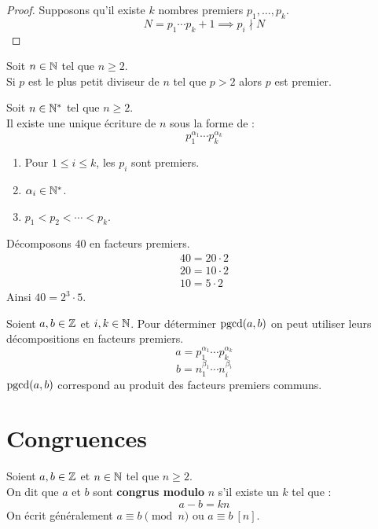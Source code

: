 \begin{proof}
	Supposons qu'il existe $k$ nombres premiers $p_1, \ldots, p_k$.
	\[ N = p_1 \cdots p_k + 1 \implies p_i \nmid N \]
\end{proof}

\begin{lemma}
	Soit $n \in \mathbb{N}$ tel que $n \geq 2$.
	\\
	Si $p$ est le plus petit diviseur de $n$ tel que $p > 2$ alors $p$ est premier.
\end{lemma}

\begin{theorem}
	Soit $n \in \mathbb{N}^*$ tel que $n \geq 2$. 
	\\
	Il existe une unique écriture de $n$ sous la forme de :
	\[ p_1^{\alpha_1} \cdots p_k^{\alpha_k} \]
	\begin{enumerate}
		\item Pour $1 \leq i \leq k$, les $p_i$ sont premiers.
		\item $\alpha_i \in \mathbb{N}^*$.
		\item $p_1 < p_2 < \cdots < p_k$.
	\end{enumerate}
\end{theorem}

\begin{example}
	Décomposons $40$ en facteurs premiers.
	\begin{align*}
		40 = 20 \cdot 2 \\
		20 = 10 \cdot 2 \\
		10 = 5 \cdot 2
	\end{align*}
	Ainsi $40 = 2^3 \cdot 5$.
\end{example}

\begin{proposition}
	Soient $a, b \in \mathbb{Z}$ et $i, k \in \mathbb{N}$. Pour déterminer $\operatorname{pgcd}(a, b)$ on peut utiliser leurs décompositions en facteurs premiers.
	\[ a = p_1^{\alpha_1} \cdots p_k^{\alpha_k} \]
	\[ b = n_1^{\beta_1} \cdots n_i^{\beta_i} \]
	$\operatorname{pgcd}(a, b)$ correspond au produit des facteurs premiers communs.
\end{proposition}

\section{Congruences}
\begin{definition}
	Soient $a, b \in \mathbb{Z}$ et $n \in \mathbb{N}$ tel que $n \geq 2$.
	\\
	On dit que $a$ et $b$ sont \textbf{congrus modulo} $n$ s'il existe un $k$ tel que :
	\[ a - b = k n \]
	On écrit généralement $a \equiv b \pmod n$ ou $a \equiv b \ [n]$.
\end{definition}

